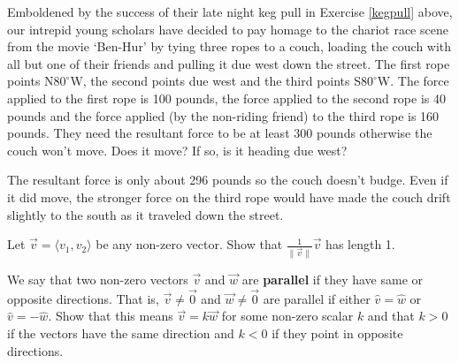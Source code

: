 \documentclass{ximera}
\begin{document}
\begin{problem}
Emboldened by the success of their late night keg pull in Exercise \ref{kegpull} above, our intrepid young scholars have decided to pay homage to the chariot race scene from the movie `Ben-Hur' by tying three ropes to a couch, loading the couch with all but one of their friends and pulling it due west down the street. The first rope points N$80^{\circ}$W, the second points due west and the third points S$80^{\circ}$W.  The force applied to the first rope is 100 pounds, the force applied to the second rope is 40 pounds and the force applied (by the non-riding friend) to the third rope is 160 pounds.  They need the resultant force to be at least 300 pounds otherwise the couch won't move.  Does it move?  If so, is it heading due west?

\begin{solution}
The resultant force is only about 296 pounds so the couch doesn't budge.  Even if it did move, the stronger force on the third rope would have made the couch drift slightly to the south as it traveled down the street. 
\end{solution}
\end{problem}

\begin{problem}
Let $\overrightarrow{v} = \langle v_1, v_2 \rangle$ be any non-zero vector. Show that $\frac{1}{\|\overrightarrow{v}\|} \overrightarrow{v}$ has length 1.
\end{problem}

\begin{problem} \label{parallelvectorexercise}
We say that two non-zero vectors $\overrightarrow{v}$ and $\overrightarrow{w}$ are {\bf parallel} if they have same or opposite directions.  That is, $\overrightarrow{v} \neq \overrightarrow{0}$ and $\overrightarrow{w} \neq \overrightarrow{0}$ are parallel if either $\hat{v} = \hat{w}$ or $\hat{v} = -\hat{w}$.  Show that this means $\overrightarrow{v} = k\overrightarrow{w}$ for some non-zero scalar $k$ and that $k > 0$ if the vectors have the same direction and $k < 0$ if they point in opposite directions.
\end{problem}
\end{document}
